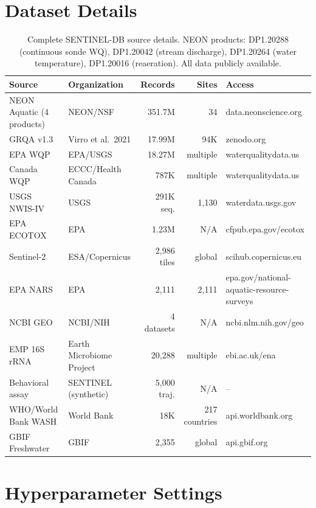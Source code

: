 \section{Dataset Details}
\label{sec:appendix_data}

\begin{table}[h]
\centering
\caption{Complete SENTINEL-DB source details. NEON products: DP1.20288 (continuous sonde WQ), DP1.20042 (stream discharge), DP1.20264 (water temperature), DP1.20016 (reaeration). All data publicly available.}
\label{tab:data_sources}
\small
\begin{tabular}{llrrl}
\toprule
\textbf{Source} & \textbf{Organization} & \textbf{Records} & \textbf{Sites} & \textbf{Access} \\
\midrule
NEON Aquatic (4 products) & NEON/NSF & 351.7M & 34 & data.neonscience.org \\
GRQA v1.3 & Virro et al.\ 2021 & 17.99M & 94K & zenodo.org \\
EPA WQP & EPA/USGS & 18.27M & multiple & waterqualitydata.us \\
Canada WQP & ECCC/Health Canada & 787K & multiple & waterqualitydata.us \\
USGS NWIS-IV & USGS & 291K seq. & 1,130 & waterdata.usgs.gov \\
EPA ECOTOX & EPA & 1.23M & N/A & cfpub.epa.gov/ecotox \\
Sentinel-2 & ESA/Copernicus & 2,986 tiles & global & scihub.copernicus.eu \\
EPA NARS & EPA & 2,111 & 2,111 & epa.gov/national-aquatic-resource-surveys \\
NCBI GEO & NCBI/NIH & 4 datasets & N/A & ncbi.nlm.nih.gov/geo \\
EMP 16S rRNA & Earth Microbiome Project & 20,288 & multiple & ebi.ac.uk/ena \\
Behavioral assay & SENTINEL (synthetic) & 5,000 traj. & N/A & -- \\
WHO/World Bank WASH & World Bank & 18K & 217 countries & api.worldbank.org \\
GBIF Freshwater & GBIF & 2,355 & global & api.gbif.org \\
\bottomrule
\end{tabular}
\end{table}

\section{Hyperparameter Settings}
\label{sec:appendix_hyperparams}

